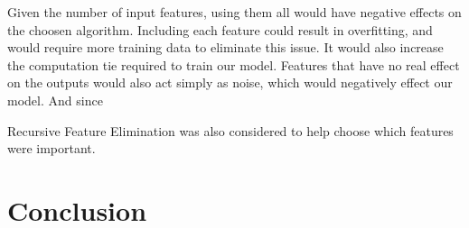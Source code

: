 \documentclass[12pt]{article}
\begin{document}
Given the number of input features, using them all would have negative effects on the choosen algorithm. Including each feature could result in overfitting, and would require more training data to eliminate this issue. It would also increase the computation tie required to train our model. Features that have no real effect on the outputs would also act simply as noise, which would negatively effect our model. And since 

Recursive Feature Elimination was also considered to help choose which features were important.

\part*{Conclusion}



\end{document}
